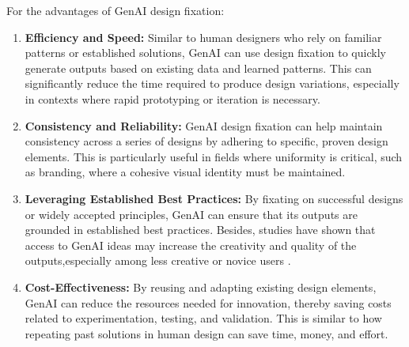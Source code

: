 For the advantages of GenAI design fixation:
\begin{enumerate}
    \item \textbf{Efficiency and Speed: }Similar to human designers who rely on familiar patterns or established solutions, GenAI can use design fixation to quickly generate outputs based on existing data and learned patterns. This can significantly reduce the time required to produce design variations, especially in contexts where rapid prototyping or iteration is necessary.
    \item \textbf{Consistency and Reliability: }GenAI design fixation can help maintain consistency across a series of designs by adhering to specific, proven design elements. This is particularly useful in fields where uniformity is critical, such as branding, where a cohesive visual identity must be maintained.
    \item \textbf{Leveraging Established Best Practices: }By fixating on successful designs or widely accepted principles, GenAI can ensure that its outputs are grounded in established best practices. Besides, studies have shown that access to GenAI ideas may increase the creativity and quality of the outputs,especially among less creative or novice users \cite{doshi2024generative}.
    \item \textbf{Cost-Effectiveness: }By reusing and adapting existing design elements, GenAI can reduce the resources needed for innovation, thereby saving costs related to experimentation, testing, and validation. This is similar to how repeating past solutions in human design can save time, money, and effort.
\end{enumerate}

